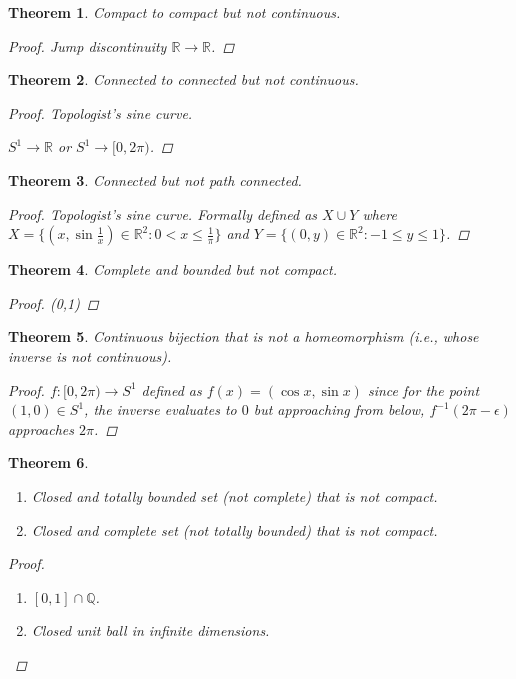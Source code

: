 \documentclass[11pt]{article}
\newcommand{\bbQ}{\mathbb{Q}}
\newcommand{\bbR}{\mathbb{R}}
\renewcommand{\_}[1]{\underline{ #1 }}
\newtheorem{theorem}{Theorem}[section]
\theoremstyle{definition}
\numberwithin{equation}{subsection}
\begin{document}
\begin{theorem}
Compact to compact but not continuous.    
\begin{proof}
    Jump discontinuity $\bbR \to \bbR$.
\end{proof}
\end{theorem}

\begin{theorem}
    Connected to connected but not continuous.
    \begin{proof}
Topologist's sine curve.

$S^1 \to \bbR$ or $S^1 \to [0,2\pi)$.
\end{proof}
\end{theorem}

\begin{theorem}
Connected but not path connected.
\begin{proof}
Topologist's sine curve. Formally defined as $X \cup Y$ where $X=\{(x,\sin \frac{1}{x})\in \bbR^2: 0<x\leq \frac{1}{\pi}\}$ and $Y=\{(0,y) \in \bbR^2: -1\leq y\leq 1\}$.
\end{proof}
\end{theorem}

\begin{theorem}
    Complete and bounded but not compact.
    \begin{proof}
        (0,1)
    \end{proof}
\end{theorem}

\begin{theorem}
Continuous bijection that is not a homeomorphism (i.e., whose inverse is not continuous).

\begin{proof}
$f: [0,2\pi) \to S^1$ defined as $f(x)=(\cos x, \sin x)$ since for the point $(1,0)\in S^1$, the inverse evaluates to $0$ but approaching from below, $f^{-1}(2\pi -\epsilon)$ approaches $2\pi$. 
\end{proof}
\end{theorem}

\begin{theorem}
\begin{enumerate}
    \item  Closed and totally bounded set (not complete) that is not compact.
    \item Closed and complete set (not totally bounded) that is not compact.
\end{enumerate}

\begin{proof}
    \begin{enumerate}
        \item $[0,1] \cap \bbQ$.
        \item Closed unit ball in infinite dimensions.
    \end{enumerate}
\end{proof}
\end{theorem}
\end{document}
